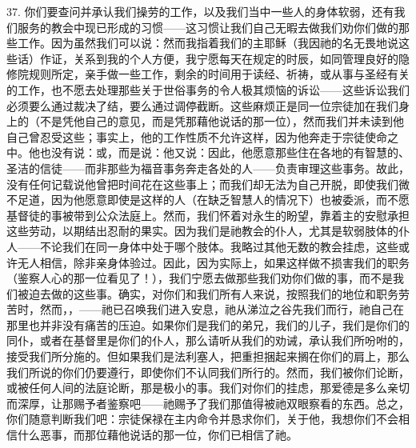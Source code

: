 37. 你们要查问并承认我们操劳的工作，以及我们当中一些人的身体软弱，还有我们服务的教会中现已形成的习惯——这习惯让我们自己无暇去做我们劝你们做的那些工作。因为虽然我们可以说：然而我指着我们的主耶稣（我因祂的名无畏地说这些话）作证，关系到我的个人方便，我宁愿每天在规定的时辰，如同管理良好的隐修院规则所定，亲手做一些工作，剩余的时间用于读经、祈祷，或从事与圣经有关的工作，也不愿去处理那些关于世俗事务的令人极其烦恼的诉讼——这些诉讼我们必须要么通过裁决了结，要么通过调停截断。这些麻烦正是同一位宗徒加在我们身上的（不是凭他自己的意见，而是凭那藉他说话的那一位），然而我们并未读到他自己曾忍受这些；事实上，他的工作性质不允许这样，因为他奔走于宗徒使命之中。他也没有说：或，而是说：他又说：因此，他愿意那些住在各地的有智慧的、圣洁的信徒——而非那些为福音事务奔走各处的人——负责审理这些事务。故此，没有任何记载说他曾把时间花在这些事上；而我们却无法为自己开脱，即使我们微不足道，因为他愿意即使是这样的人（在缺乏智慧人的情况下）也被委派，而不愿基督徒的事被带到公众法庭上。然而，我们怀着对永生的盼望，靠着主的安慰承担这些劳动，以期结出忍耐的果实。因为我们是祂教会的仆人，尤其是软弱肢体的仆人——不论我们在同一身体中处于哪个肢体。我略过其他无数的教会挂虑，这些或许无人相信，除非亲身体验过。因此，因为实际上，如果这样做不损害我们的职务（鉴察人心的那一位看见了！），我们宁愿去做那些我们劝你们做的事，而不是我们被迫去做的这些事。确实，对你们和我们所有人来说，按照我们的地位和职务劳苦时，然而，，——祂已召唤我们进入安息，祂从涕泣之谷先我们而行，祂自己在那里也并非没有痛苦的压迫。如果你们是我们的弟兄，我们的儿子，我们是你们的同仆，或者在基督里是你们的仆人，那么请听从我们的劝诫，承认我们所吩咐的，接受我们所分施的。但如果我们是法利塞人，把重担捆起来搁在你们的肩上，那么我们所说的你们仍要遵行，即使你们不认同我们所行的。然而，我们被你们论断，或被任何人间的法庭论断，那是极小的事。我们对你们的挂虑，那爱德是多么亲切而深厚，让那赐予者鉴察吧——祂赐予了我们那值得被祂双眼察看的东西。总之，你们随意判断我们吧：宗徒保禄在主内命令并恳求你们，关于他，我想你们不会相信什么恶事，而那位藉他说话的那一位，你们已相信了祂。\par

